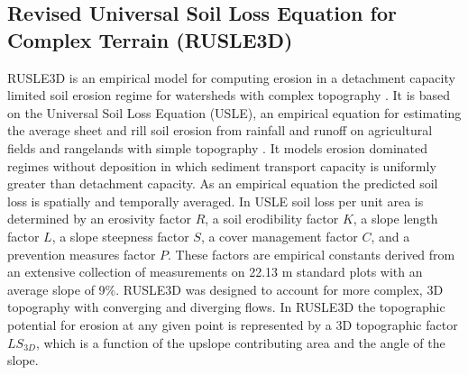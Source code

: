 \documentclass[gmd, manuscript]{copernicus}
\begin{document}

\subsection{Revised Universal Soil Loss Equation for Complex Terrain (RUSLE3D)}
\label{rusle_model}
RUSLE3D is an empirical model for computing erosion 
in a detachment capacity limited soil erosion regime
for watersheds with complex topography \citep{Mitasova1996}. 
It is based on 
the Universal Soil Loss Equation (USLE),
an empirical equation for estimating the average
sheet and rill soil erosion from rainfall and runoff
on agricultural fields and rangelands with simple topography 
\citep{Wischmeier1978}. 
It models erosion dominated regimes without deposition
in which sediment transport capacity is 
uniformly greater than detachment capacity.
As an empirical equation the predicted soil loss 
is spatially and temporally averaged. 
In USLE soil loss per unit area is determined by 
an erosivity factor $R$,
a soil erodibility factor $K$, 
a slope length factor $L$,
a slope steepness factor $S$,
a cover management factor $C$,
and a prevention measures factor $P$.
These factors are empirical constants derived 
from an extensive collection of measurements 
on 22.13 \unit{m} standard plots with an average slope of 9$\%$.  
RUSLE3D was designed to account for more complex, 3D topography 
with converging and diverging flows. 
In RUSLE3D the topographic potential for erosion at any given point 
is represented by a 3D topographic factor $LS_{3D}$,
which is a function of the upslope contributing area 
and the angle of the slope. 
\end{document}
